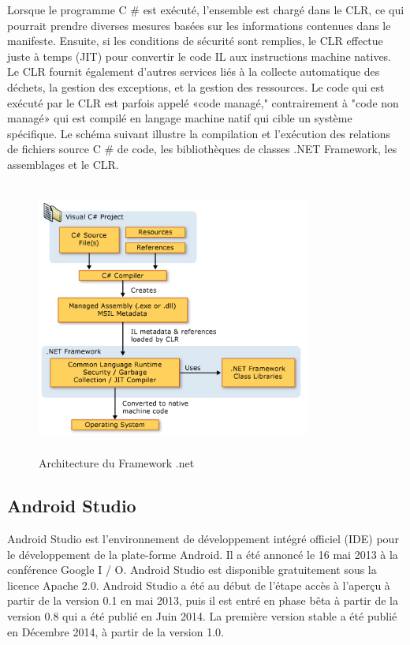 \documentclass[11pt, a4paper, twoside]{book}
\begin{document}
Lorsque le programme C \# est exécuté, l'ensemble est chargé dans le CLR, ce qui pourrait prendre diverses mesures basées sur les informations contenues dans le manifeste. Ensuite, si les conditions de sécurité sont remplies, le CLR effectue juste à temps (JIT) pour convertir le code IL aux instructions machine natives. Le CLR fournit également d'autres services liés à la collecte automatique des déchets, la gestion des exceptions, et la gestion des ressources. Le code qui est exécuté par le CLR est parfois appelé «code managé," contrairement à "code non managé» qui est compilé en langage machine natif qui cible un système spécifique. Le schéma suivant illustre la compilation et l'exécution des relations de fichiers source C \# de code, les bibliothèques de classes .NET Framework, les assemblages et le CLR.
\begin{figure}[H]
\centering
\includegraphics[width=9cm,height=9cm]{net}
\caption{Architecture du Framework .net}
\end{figure}
\subsection{Android Studio}
Android Studio est l'environnement de développement intégré officiel (IDE) pour le développement de la plate-forme Android. Il a été annoncé le 16 mai 2013 à la conférence Google I / O. Android Studio est disponible gratuitement sous la licence Apache 2.0. Android Studio a été au début de l'étape accès à l'aperçu à partir de la version 0.1 en mai 2013, puis il est entré en phase bêta à partir de la version 0.8 qui a été publié en Juin 2014. La première version stable a été publié en Décembre 2014, à partir de la version 1.0.\\
\end{document}
